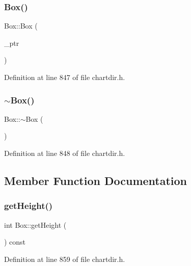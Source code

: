 \subsubsection{\texorpdfstring{Box()}{Box()}}
{\footnotesize\ttfamily Box\+::\+Box (\begin{DoxyParamCaption}\item[{Box\+Internal $\ast$}]{\+\_\+ptr }\end{DoxyParamCaption})\hspace{0.3cm}{\ttfamily [inline]}}



Definition at line 847 of file chartdir.\+h.

\mbox{\label{class_box_a6a5e09398e85d602a046b429062fb9c2}} 
\subsubsection{\texorpdfstring{$\sim$\+Box()}{~Box()}}
{\footnotesize\ttfamily Box\+::$\sim$\+Box (\begin{DoxyParamCaption}{ }\end{DoxyParamCaption})\hspace{0.3cm}{\ttfamily [inline]}}



Definition at line 848 of file chartdir.\+h.



\subsection{Member Function Documentation}
\mbox{\label{class_box_a3bfc762d093200d993d77fe89e0c6f18}} 
\subsubsection{\texorpdfstring{get\+Height()}{getHeight()}}
{\footnotesize\ttfamily int Box\+::get\+Height (\begin{DoxyParamCaption}{ }\end{DoxyParamCaption}) const\hspace{0.3cm}{\ttfamily [inline]}}



Definition at line 859 of file chartdir.\+h.

